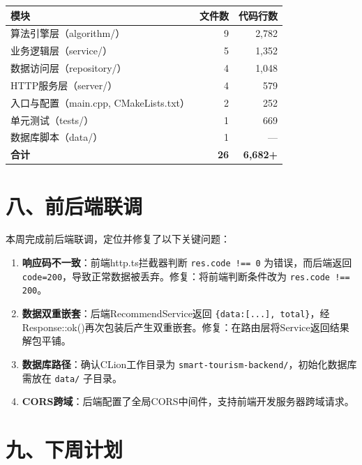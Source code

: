 \documentclass[12pt,a4paper]{article}
\begin{document}
\begin{center}
\begin{tabular}{l r r}
    \toprule
    \bfseries 模块 & \bfseries 文件数 & \bfseries 代码行数 \\
    \midrule
    算法引擎层（algorithm/） & 9 & 2,782 \\
    业务逻辑层（service/）  & 5 & 1,352 \\
    数据访问层（repository/） & 4 & 1,048 \\
    HTTP服务层（server/）    & 4 & 579 \\
    入口与配置（main.cpp, CMakeLists.txt） & 2 & 252 \\
    单元测试（tests/）       & 1 & 669 \\
    数据库脚本（data/）      & 1 & --- \\
    \midrule
    \textbf{合计} & \textbf{26} & \textbf{6,682+} \\
    \bottomrule
\end{tabular}
\end{center}

\section*{八、前后端联调}

本周完成前后端联调，定位并修复了以下关键问题：

\begin{enumerate}[leftmargin=2em]
    \item \textbf{响应码不一致}：前端http.ts拦截器判断 \texttt{res.code !== 0} 为错误，而后端返回 \texttt{code=200}，导致正常数据被丢弃。修复：将前端判断条件改为 \texttt{res.code !== 200}。
    \item \textbf{数据双重嵌套}：后端RecommendService返回 \texttt{\{data:[...], total\}}，经Response::ok()再次包装后产生双重嵌套。修复：在路由层将Service返回结果解包平铺。
    \item \textbf{数据库路径}：确认CLion工作目录为 \texttt{smart-tourism-backend/}，初始化数据库需放在 \texttt{data/} 子目录。
    \item \textbf{CORS跨域}：后端配置了全局CORS中间件，支持前端开发服务器跨域请求。
\end{enumerate}

\section*{九、下周计划}
\end{document}
